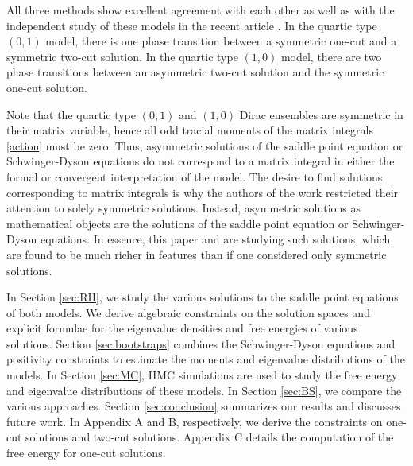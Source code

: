 \documentclass[10pt]{article}
\theoremstyle{plain}
\theoremstyle{definition}
\theoremstyle{plain}
\begin{document}
All three methods show excellent agreement with each other as well as with the independent study of these models in the recent article \cite{d2026symmetry}. In the quartic type $(0,1)$ model, there is one phase transition between a symmetric one-cut and a symmetric two-cut solution. In the quartic type $(1,0)$ model, there are two phase transitions between an asymmetric two-cut solution and the symmetric one-cut solution.

Note that the quartic type $(0,1)$ and $(1,0)$ Dirac ensembles are symmetric in their matrix variable, hence all odd tracial moments of the matrix integrals \eqref{action} must be zero. Thus, asymmetric solutions of the saddle point equation or Schwinger-Dyson equations do not correspond to a matrix integral in either the formal or convergent interpretation of the model. The desire to find solutions corresponding to matrix integrals is why the authors of the work \cite{khalkhali2020phase} restricted their attention to solely symmetric solutions. Instead, asymmetric solutions as mathematical objects are the solutions of the saddle point equation or Schwinger-Dyson equations. In essence, this paper and \cite{d2026symmetry} are studying such solutions, which are found to be much richer in features than if one considered only symmetric solutions. 

In Section \ref{sec:RH}, we study the various solutions to the saddle point equations of both models. We derive algebraic constraints on the solution spaces and explicit formulae for the eigenvalue densities and free energies of various solutions. Section \ref{sec:bootstraps} combines the Schwinger-Dyson equations and positivity constraints to estimate the moments and eigenvalue distributions of the models. In Section \ref{sec:MC}, HMC simulations are used to study the free energy and eigenvalue distributions of these models. In Section \ref{sec:BS}, we compare the various approaches. Section \ref{sec:conclusion} summarizes our results and discusses future work.
In Appendix A and B, respectively, we derive the constraints on one-cut solutions and two-cut solutions. Appendix C details the computation of the free energy for one-cut solutions.
\end{document}
